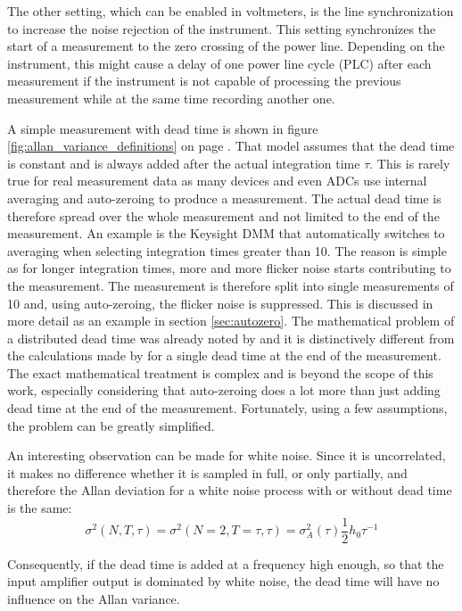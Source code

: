 The other setting, which can be enabled in voltmeters, is the line synchronization to increase the noise rejection of the instrument. This setting synchronizes the start of a measurement to the zero crossing of the power line. Depending on the instrument, this might cause a delay of one power line cycle (PLC) after each measurement if the instrument is not capable of processing the previous measurement while at the same time recording another one.

A simple measurement with dead time is shown in figure \ref{fig:allan_variance_definitions} on page \pageref{fig:allan_variance_definitions}. That model assumes that the dead time is constant and is always added after the actual integration time $\tau$. This is rarely true for real measurement data as many devices and even ADCs use internal averaging and auto-zeroing to produce a measurement. The actual dead time is therefore spread over the whole measurement and not limited to the end of the measurement. An example is the Keysight  DMM that automatically switches to averaging when selecting integration times greater than \qty{10}{\plc}. The reason is simple as for longer integration times, more and more flicker noise starts contributing to the measurement. The measurement is therefore split into single measurements of \qty{10}{\plc} and, using auto-zeroing, the flicker noise is suppressed. This is discussed in more detail as an example in section \ref{sec:autozero}. The mathematical problem of a distributed dead time was already noted by \citeauthor{adev_noise_types} \cite{adev_noise_types} and it is distinctively different from the calculations made by \citeauthor{psd_to_adev} \cite{psd_to_adev} for a single dead time at the end of the measurement. The exact mathematical treatment is complex and is beyond the scope of this work, especially considering that auto-zeroing does a lot more than just adding dead time at the end of the measurement. Fortunately, using a few assumptions, the problem can be greatly simplified.

An interesting observation can be made for white noise. Since it is uncorrelated, it makes no difference whether it is sampled in full, or only partially, and therefore the Allan deviation for a white noise process with or without dead time is the same:
\begin{equation}
    \sigma^2(N,T, \tau) = \sigma^2(N=2,T=\tau, \tau) = \sigma_A^2(\tau) \frac 1 2 h_0 \tau^{-1}
\end{equation}

Consequently, if the dead time is added at a frequency high enough, so that the input amplifier output is dominated by white noise, the dead time will have no influence on the Allan variance.

